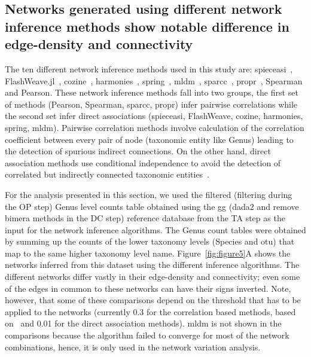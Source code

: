 
  \FloatBarrier

  \subsection*{Networks generated using different network inference methods show notable difference in edge-density and connectivity}

  The ten different network inference methods used in this study are: \ac{spieceasi}~\cite{Kurtz2015}, FlashWeave.jl~\cite{tackmannRapidInferenceDirect2019}, \ac{cozine}~\cite{haCompositionalZeroinflatedNetwork2020a}, \ac{harmonies}~\cite{jiangHARMONIESHybridApproach2020}, \ac{spring}~\cite{yoonMicrobialNetworksSPRING2019}, \ac{mldm}~\cite{Yang2017}, \ac{sparcc}~\cite{Friedman2012,Watts2018}, propr~\cite{quinnProprRpackageIdentifying2017}, Spearman and Pearson.
  These network inference methods fall into two groups, the first set of methods (Pearson, Spearman, \ac{sparcc}, propr) infer pairwise correlations while the second set infer direct associations (\ac{spieceasi}, FlashWeave, \ac{cozine}, \ac{harmonies}, \ac{spring}, \ac{mldm}).
  Pairwise correlation methods involve calculation of the correlation coefficient between every pair of node (taxonomic entity like Genus) leading to the detection of spurious indirect connections.
  On the other hand, direct association methods use conditional independence to avoid the detection of correlated but indirectly connected taxonomic entities~\cite{Kurtz2015,Menon2018}.

  For the analysis presented in this section, we used the filtered (filtering during the OP step) Genus level counts table obtained using the \ac{gg} (dada2 and remove bimera methods in the DC step) reference database from the TA step as the input for the network inference algorithms.
  The Genus count tables were obtained by summing up the counts of the lower taxonomy levels (Species and \ac{otu}) that map to the same higher taxonomy level name.
  Figure~\ref{fig:figure5}A shows the networks inferred from this dataset using the different inference algorithms.
  The different networks differ vastly in their edge-density and connectivity; even some of the edges in common to these networks can have their signs inverted.
  Note, however, that some of these comparisons depend on the threshold that has to be applied to the networks (currently 0.3 for the correlation based methods, based on~\cite{Friedman2012} and 0.01 for the direct association methods).
  \ac{mldm} is not shown in the comparisons because the algorithm failed to converge for most of the network combinations, hence, it is only used in the network variation analysis.

